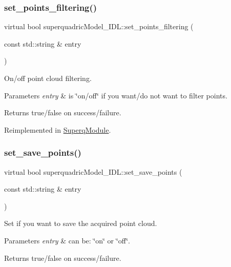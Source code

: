 \subsubsection{\texorpdfstring{set\+\_\+points\+\_\+filtering()}{set\_points\_filtering()}}
{\footnotesize\ttfamily virtual bool superquadric\+Model\+\_\+\+I\+D\+L\+::set\+\_\+points\+\_\+filtering (\begin{DoxyParamCaption}\item[{const std\+::string \&}]{entry }\end{DoxyParamCaption})\hspace{0.3cm}{\ttfamily [virtual]}}



On/off point cloud filtering. 


\begin{DoxyParams}{Parameters}
{\em entry} & is \char`\"{}on/off\char`\"{} if you want/do not want to filter points. \\
\hline
\end{DoxyParams}
\begin{DoxyReturn}{Returns}
true/false on success/failure. 
\end{DoxyReturn}


Reimplemented in \mbox{\hyperlink{classSuperqModule_a408203d0119443fb61544f84dafff8a4}{Superq\+Module}}.

\mbox{\label{classsuperquadricModel__IDL_a8368b783845a3e5ae7e0706ee5b888c0}} 
\subsubsection{\texorpdfstring{set\+\_\+save\+\_\+points()}{set\_save\_points()}}
{\footnotesize\ttfamily virtual bool superquadric\+Model\+\_\+\+I\+D\+L\+::set\+\_\+save\+\_\+points (\begin{DoxyParamCaption}\item[{const std\+::string \&}]{entry }\end{DoxyParamCaption})\hspace{0.3cm}{\ttfamily [virtual]}}



Set if you want to save the acquired point cloud. 


\begin{DoxyParams}{Parameters}
{\em entry} & can be\+: \char`\"{}on\char`\"{} or \char`\"{}off\char`\"{}. \\
\hline
\end{DoxyParams}
\begin{DoxyReturn}{Returns}
true/false on success/failure. 
\end{DoxyReturn}


